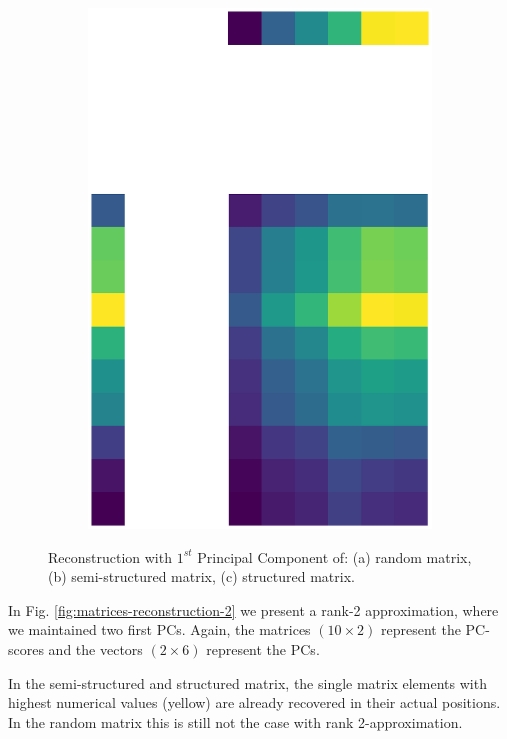 \documentclass[10pt,twocolumn]{article}
\begin{document}
\begin{figure}[H]
\begin{subfigure}[t]{.15\textwidth}
\includegraphics[scale=.2]{DWGs/structured-matrix-reconstruction-PCs-1.eps}
\caption{ }
\end{subfigure}
\caption{Reconstruction with $1^{st}$ Principal Component of: (a) random matrix, (b) semi-structured matrix, (c) structured matrix.}
\label{fig:matrices-reconstruction-1}
\end{figure}

In Fig. \ref{fig:matrices-reconstruction-2} we present a rank-2 approximation, where we maintained two first PCs. Again, the matrices $(10 \times 2)$ represent the PC-scores and the vectors $(2 \times 6)$ represent the PCs.

In the semi-structured and structured matrix, the single matrix elements with highest numerical values (yellow) are already recovered in their actual positions. In the random matrix this is still not the case with rank 2-approximation.
\end{document}
